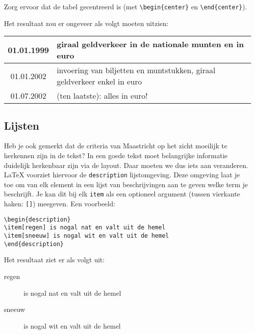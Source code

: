 \documentclass[12pt, dutch]{article}
\newcommand{\bs}{\textbackslash}
\begin{document}
\begin{tcolorbox}[title=Opgave 5b]
  Zorg ervoor dat de tabel gecentreerd is (met \texttt{\bs{}begin\{center\}} en
  \texttt{\bs{}end\{center\}}).
\end{tcolorbox}

Het resultaat zou er ongeveer als volgt moeten uitzien:

\begin{center}
  \begin{tabular}{|c|p{7cm}|}
    \hline
    01.01.1999 & giraal geldverkeer in de nationale munten en in euro                     \\ \hline
    01.01.2002 & invoering van biljetten en muntstukken, giraal geldverkeer enkel in euro \\ \hline
    01.07.2002 & (ten laatste): alles in euro!                                            \\ \hline
  \end{tabular}
\end{center}

\subsection{Lijsten}

Heb je ook gemerkt dat de criteria van Maastricht op het zicht
moeilijk te herkennen zijn in de tekst? In een goede tekst moet
belangrijke informatie duidelijk herkenbaar zijn via de layout. Daar
moeten we dus iets aan veranderen. \LaTeX{} voorziet hiervoor de
\texttt{description} lijstomgeving. Deze omgeving laat je toe om van
elk element in een lijst van beschrijvingen aan te geven welke term je
beschrijft. Je kan dit bij elk \texttt{item} als een optioneel argument
(tussen vierkante haken: \texttt{[]}) meegeven. Een voorbeeld:
\begin{verbatim}
\begin{description}
\item[regen] is nogal nat en valt uit de hemel
\item[sneeuw] is nogal wit en valt uit de hemel
\end{description}
\end{verbatim}

Het resultaat ziet er als volgt uit:
\begin{description}
  \item[regen] is nogal nat en valt uit de hemel
  \item[sneeuw] is nogal wit en valt uit de hemel
\end{description}
\end{document}
